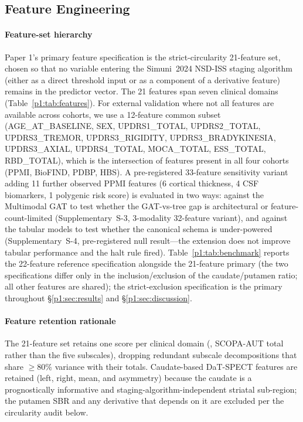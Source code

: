 \subsection{Feature Engineering}
\label{p1:sec:methods:features}

\paragraph*{Feature-set hierarchy} Paper 1's primary feature specification is the strict-circularity 21-feature set, chosen so that no variable entering the Simuni~2024 NSD-ISS staging algorithm (either as a direct threshold input or as a component of a derivative feature) remains in the predictor vector. The 21 features span seven clinical domains (Table~\ref{p1:tab:features}). For external validation where not all features are available across cohorts, we use a 12-feature common subset (AGE\_AT\_BASELINE, SEX, UPDRS1\_TOTAL, UPDRS2\_TOTAL, UPDRS3\_TREMOR, UPDRS3\_RIGIDITY, UPDRS3\_BRADYKINESIA, UPDRS3\_AXIAL, UPDRS4\_TOTAL, MOCA\_TOTAL, ESS\_TOTAL, RBD\_TOTAL), which is the intersection of features present in all four cohorts (PPMI, BioFIND, PDBP, HBS). A pre-registered 33-feature sensitivity variant adding 11 further observed PPMI features (6 cortical thickness, 4 CSF biomarkers, 1 polygenic risk score) is evaluated in two ways: against the Multimodal GAT to test whether the GAT-vs-tree gap is architectural or feature-count-limited (Supplementary~S-3, 3-modality 32-feature variant), and against the tabular models to test whether the canonical schema is under-powered (Supplementary~S-4, pre-registered null result---the extension does not improve tabular performance and the halt rule fired). Table~\ref{p1:tab:benchmark} reports the 22-feature reference specification alongside the 21-feature primary (the two specifications differ only in the inclusion/exclusion of the caudate/putamen ratio; all other features are shared); the strict-exclusion specification is the primary throughout \S\ref{p1:sec:results} and \S\ref{p1:sec:discussion}.

\paragraph*{Feature retention rationale} The 21-feature set retains one score per clinical domain (\eg, SCOPA-AUT total rather than the five subscales), dropping redundant subscale decompositions that share $\geq 80\%$ variance with their totals. Caudate-based DaT-SPECT features are retained (left, right, mean, and asymmetry) because the caudate is a prognostically informative and staging-algorithm-independent striatal sub-region; the putamen SBR and any derivative that depends on it are excluded per the circularity audit below.

